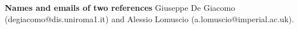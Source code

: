 \documentclass[10.5pt,a4paper,sans]{moderncv}
\begin{document}
\textbf{Names and emails of two references}
Giuseppe De Giacomo (degiacomo@dis.uniroma1.it) and Alessio Lomuscio (a.lomuscio@imperial.ac.uk).
% 
% 


\makeletterclosing
\end{document}
